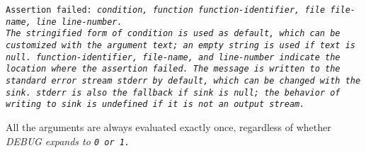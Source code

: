 \tt{Assertion failed:} \it{condition}\tt{, function}
\it{function-identifier}\tt{, file}
\it{file-name}\tt{, line}
\it{line-number}\tt{.}\\

The stringified form of \it{condition} is used as default,
which can be customized with the argument \it{text};
an empty string is used if \it{text} is null.
\it{function-identifier}, \it{file-name}, and \it{line-number}
indicate the location where the assertion failed.
The message is written to the standard error stream \tt{stderr} by default,
which can be changed with the \it{sink}.
\tt{stderr} is also the fallback if \it{sink} is null; the behavior
of writing to \it{sink} is undefined if it is not an output stream.

All the arguments are always evaluated exactly once,
regardless of whether \it{DEBUG} expands to \tt{0} or \tt{1}.
